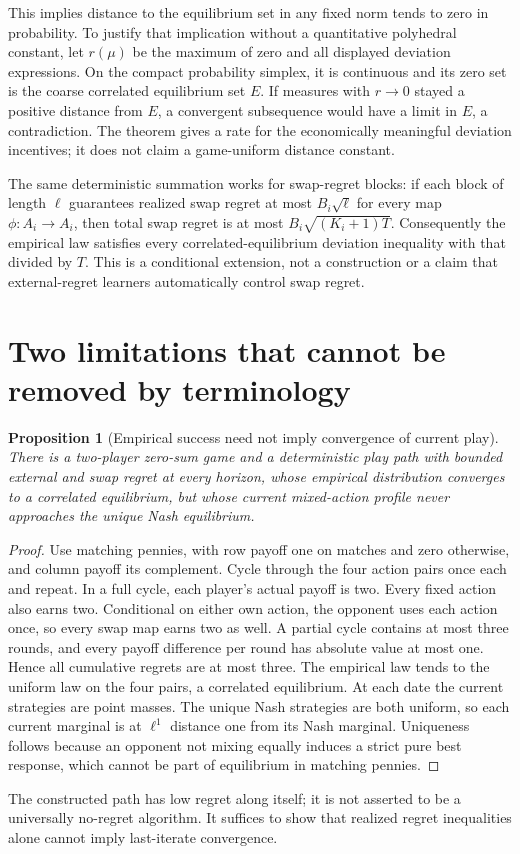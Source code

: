 \documentclass[11pt,a4paper]{article}
\newtheorem{proposition}[theorem]{Proposition}
\theoremstyle{remark}
\begin{document}
This implies distance to the equilibrium set in any fixed norm tends to zero in probability. To justify that implication without a quantitative polyhedral constant, let $r(\mu)$ be the maximum of zero and all displayed deviation expressions. On the compact probability simplex, it is continuous and its zero set is the coarse correlated equilibrium set $E$. If measures with $r\to0$ stayed a positive distance from $E$, a convergent subsequence would have a limit in $E$, a contradiction. The theorem gives a rate for the economically meaningful deviation incentives; it does not claim a game-uniform distance constant.

The same deterministic summation works for swap-regret blocks: if each block of length $\ell$ guarantees realized swap regret at most $B_i\sqrt\ell$ for every map $\phi:A_i\to A_i$, then total swap regret is at most $B_i\sqrt{(K_i+1)T}$. Consequently the empirical law satisfies every correlated-equilibrium deviation inequality with that divided by $T$. This is a conditional extension, not a construction or a claim that external-regret learners automatically control swap regret.

\section{Two limitations that cannot be removed by terminology}
\begin{proposition}[Empirical success need not imply convergence of current play]
There is a two-player zero-sum game and a deterministic play path with bounded external and swap regret at every horizon, whose empirical distribution converges to a correlated equilibrium, but whose current mixed-action profile never approaches the unique Nash equilibrium.
\end{proposition}
\begin{proof}
Use matching pennies, with row payoff one on matches and zero otherwise, and column payoff its complement. Cycle through the four action pairs once each and repeat. In a full cycle, each player's actual payoff is two. Every fixed action also earns two. Conditional on either own action, the opponent uses each action once, so every swap map earns two as well. A partial cycle contains at most three rounds, and every payoff difference per round has absolute value at most one. Hence all cumulative regrets are at most three. The empirical law tends to the uniform law on the four pairs, a correlated equilibrium. At each date the current strategies are point masses. The unique Nash strategies are both uniform, so each current marginal is at $\ell^1$ distance one from its Nash marginal. Uniqueness follows because an opponent not mixing equally induces a strict pure best response, which cannot be part of equilibrium in matching pennies.
\end{proof}
The constructed path has low regret along itself; it is not asserted to be a universally no-regret algorithm. It suffices to show that realized regret inequalities alone cannot imply last-iterate convergence.
\end{document}

